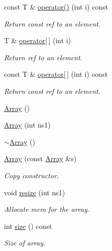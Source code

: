 \begin{DoxyCompactItemize}
const T \& \mbox{\hyperlink{classXMLArray_1_1Array_a6935c8d1efcf82e7c751717a94e7c145}{operator()}} (int i) const
\begin{DoxyCompactList}\small\item\em Return const ref to an element. \end{DoxyCompactList}\item 
T \& \mbox{\hyperlink{classXMLArray_1_1Array_a42dbfab67d875b6fa456cade78f70f8f}{operator\mbox{[}$\,$\mbox{]}}} (int i)
\begin{DoxyCompactList}\small\item\em Return ref to an element. \end{DoxyCompactList}\item 
const T \& \mbox{\hyperlink{classXMLArray_1_1Array_a8e51d308c4e6b81cdbf1be40377afda8}{operator\mbox{[}$\,$\mbox{]}}} (int i) const
\begin{DoxyCompactList}\small\item\em Return const ref to an element. \end{DoxyCompactList}\item 
\mbox{\hyperlink{classXMLArray_1_1Array_a5b81635bef141ec21cbb11a4ae235aff}{Array}} ()
\item 
\mbox{\hyperlink{classXMLArray_1_1Array_ae2ff376197c96aa965c9b04297b013cd}{Array}} (int ns1)
\item 
\mbox{\hyperlink{classXMLArray_1_1Array_ae344c6bdb93a8e4e2b5b42fda7abf94d}{$\sim$\+Array}} ()
\item 
\mbox{\hyperlink{classXMLArray_1_1Array_ab755ad52a24c32ad23940b23b1d03968}{Array}} (const \mbox{\hyperlink{classXMLArray_1_1Array}{Array}} \&s)
\begin{DoxyCompactList}\small\item\em Copy constructor. \end{DoxyCompactList}\item 
void \mbox{\hyperlink{classXMLArray_1_1Array_a470913fde270ad0e578041654e2390f0}{resize}} (int ns1)
\begin{DoxyCompactList}\small\item\em Allocate mem for the array. \end{DoxyCompactList}\item 
int \mbox{\hyperlink{classXMLArray_1_1Array_ab59904c2aa0e31c18c6cd5f5a186e292}{size}} () const
\begin{DoxyCompactList}\small\item\em Size of array. \end{DoxyCompactList}\item 

\end{DoxyCompactItemize}
